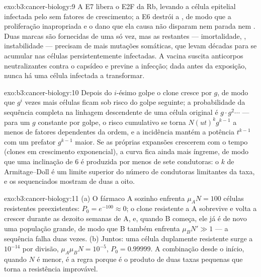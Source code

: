 \begin{solution}{exo:b3:cancer-biology:9}
A E7 libera o E2F da Rb, levando a célula epitelial infectada pelo
 sem fatores de crescimento; a E6 destrói a , de
modo que a proliferação inapropriada e o dano que ela causa não
disparam nem parada nem . Duas marcas são fornecidas de uma só
vez, mas as restantes --- imortalidade, , instabilidade ---
precisam de mais mutações somáticas, que levam décadas para se acumular
nas células persistentemente infectadas. A vacina suscita anticorpos
neutralizantes contra o capsídeo e previne a infecção; dada antes da
exposição, nunca há uma célula infectada a transformar.
\end{solution}

\begin{solution}{exo:b3:cancer-biology:10}
Depois do $i$-ésimo golpe o clone cresce por $g$, de modo que $g^{i}$
vezes mais células ficam sob risco do golpe seguinte; a probabilidade
da sequência completa na linhagem descendente de uma célula original é
$g\cdot g^{2}\cdots$ --- para um $g$ constante por golpe, o risco
cumulativo se torna $N(ut)^{k}
g^{k-1}$ a menos de fatores dependentes
da ordem, e a incidência mantém a potência $t^{k-1}$ com um prefator
$g^{k-1}$ maior. Se as próprias expansões crescerem com o tempo (clones
em crescimento exponencial), a curva fica ainda mais íngreme, de modo
que uma inclinação de $6$ é produzida por menos de sete condutoras: o
$k$ de Armitage--Doll é um limite superior do número de condutoras
limitantes da taxa, e os  sequenciados mostram de duas a oito.
\end{solution}

\begin{solution}{exo:b3:cancer-biology:11}
(a) O fármaco A sozinho enfrenta $\mu_{A}N = 100$ células resistentes
preexistentes: $P_{0} = e^{-100} \approx 0$; o clone resistente a A
sobrevive e volta a crescer durante as dezoito semanas de A, e, quando
B começa, ele já é de novo uma população grande, de modo que B também
enfrenta $\mu_{B}N' \gg 1$ --- a sequência falha duas vezes. (b)
Juntos: uma célula duplamente resistente surge a $10^{-14}$ por
divisão, $\mu_{A}\mu_{B}N = 10^{-5}$, $P_{0} =
0.99999$. A combinação
desde o início, quando $N$ é menor, é a regra porque é o produto de
duas taxas pequenas que torna a resistência improvável.
\end{solution}


